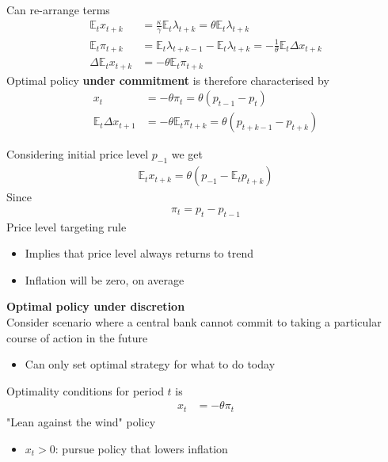 \documentclass{beamer}
\begin{document}
\begin{frame}
  Can re-arrange terms
\begin{align}
  \mathbb{E}_t x_{t+k} &= \frac{\kappa}{\gamma} \mathbb{E}_t\lambda_{t+k} = \theta \mathbb{E}_t \lambda_{t+k} \\
  \mathbb{E}_t \pi_{t+k} &= \mathbb{E}_t \lambda_{t+k-1} - \mathbb{E}_t \lambda_{t+k} = -\frac{1}{\theta}\mathbb{E}_t \Delta x_{t+k}\\
  \Delta \mathbb{E}_t x_{t+k} &= - \theta \mathbb{E}_t \pi_{t+k}
\end{align}
\medskip
Optimal policy \textbf{under commitment} is therefore characterised by
\begin{align}
  x_t &= -\theta\pi_t = \theta(p_{t-1}-p_t)\\
  \mathbb{E}_t \Delta x_{t+1} &= -\theta \mathbb{E}_t \pi_{t+k} = \theta (p_{t+k-1} - p_{t+k})
\end{align}  
\end{frame}

\begin{frame}
  Considering initial price level  $p_{-1}$ we get
\begin{align}  
  \mathbb{E}_t x_{t+k} = \theta(p_{-1} - \mathbb{E}_tp_{t+k}) 
\end{align}
\medskip
Since
\begin{align}
  \pi_t=p_t-p_{t-1}
\end{align}
\medskip
Price level targeting rule
\begin{itemize}
  \item Implies that price level always returns to trend
  \item Inflation will be zero, on average
\end{itemize}
\end{frame}


\begin{frame}
  \textbf{Optimal policy under discretion}\\  \medskip
  Consider scenario where a central bank cannot commit to taking a particular course of action in the future
  \begin{itemize}
    \item Can only set optimal strategy for what to do today    
  \end{itemize}
  \medskip
  Optimality conditions for period $t$ is
\begin{align}
  x_t &= -\theta\pi_t
\end{align}
 \medskip
 "Lean against the wind" policy
 \begin{itemize}
   \item $x_t>0$: pursue policy that lowers inflation
 \end{itemize}
\end{frame}
\end{document}
